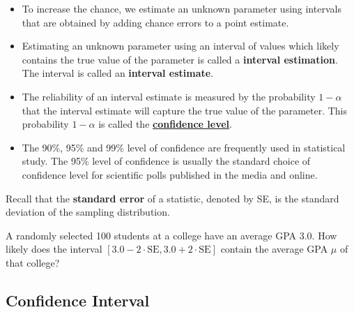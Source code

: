 \begin{itemize}
\item
  To increase the chance, we estimate an unknown parameter using
  intervals that are obtained by adding chance errors to a point
  estimate.
\item
  Estimating an unknown parameter using an interval of values which
  likely contains the true value of the parameter is called a
  \textbf{interval estimation}. The interval is called an
  \textbf{interval estimate}.
\item
  The reliability of an interval estimate is measured by the probability
  \(1-\alpha\) that the interval estimate will capture the true value of
  the parameter. This probability \(1-\alpha\) is called the
  \href{https://saylordotorg.github.io/text_introductory-statistics/s11-estimation.html}{\textbf{confidence
  level}}.
\item
  The 90\%, 95\% and 99\% level of confidence are frequently used in
  statistical study. The 95\% level of confidence is usually the
  standard choice of confidence level for scientific polls published in
  the media and online.
\end{itemize}

\begin{example}

Recall that the \textbf{standard error} of a statistic, denoted by SE,
is the standard deviation of the sampling distribution.

A randomly selected 100 students at a college have an average GPA 3.0.
How likely does the interval
\([3.0-2\cdot\text{SE}, 3.0+2\cdot\text{SE}]\) contain the average GPA
\(\mu\) of that college?

\end{example}
\vspace*{6\baselineskip}


\hypertarget{confidence-interval}{%
\subsection{Confidence Interval}\label{confidence-interval}}

